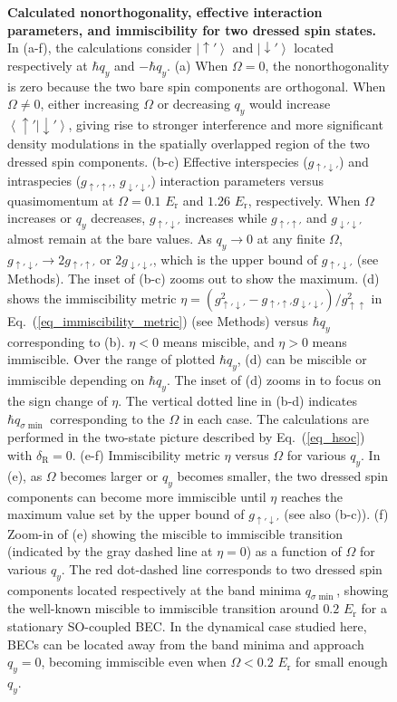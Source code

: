 \documentclass[showpacs,preprintnumbers,amsmath,amssymb, superscriptaddress, aps, reprint]{revtex4-1}
\def\E_r{E_{\text{r}}}
\def\deltaR{\delta_{\text{R}}}
\begin{document}
{{{\begin{figure}[ht]
\caption{\textbf{Calculated nonorthogonality, effective interaction parameters, and immiscibility for two dressed spin states.} In (a-f), the calculations consider $\left|\uparrow'\right\rangle$ and $\left|\downarrow'\right\rangle$ located respectively at $\hbar q_y$ and $-\hbar q_y$. (a) When $\Omega=0$, the nonorthogonality is zero because the two bare spin components are orthogonal. When $\Omega \neq 0$, either increasing $\Omega$ or decreasing $q_y$ would increase $\left\langle\uparrow'|\downarrow'\right\rangle$, giving rise to stronger interference and more significant density modulations in the spatially overlapped region of the two dressed spin components. (b-c) Effective interspecies ($g_{\uparrow'\downarrow'}$) and intraspecies ($g_{\uparrow'\uparrow'}$, $g_{\downarrow'\downarrow'}$) interaction parameters versus quasimomentum at $\Omega=0.1$ $\E_r$ and $1.26$ $\E_r$, respectively. When $\Omega$ increases or $q_y$ decreases, $g_{\uparrow'\downarrow'}$ increases while $g_{\uparrow'\uparrow'}$ and $g_{\downarrow'\downarrow'}$ almost remain at the bare values. As $q_y\rightarrow 0$ at any finite $\Omega$, $g_{\uparrow'\downarrow'}\rightarrow 2 g_{\uparrow'\uparrow'}$ or $2 g_{\downarrow'\downarrow'}$, which is the upper bound of $g_{\uparrow'\downarrow'}$ (see Methods). The inset of (b-c) zooms out to show the maximum. (d) shows the immiscibility metric $\eta=(g_{\uparrow'\downarrow'}^2-g_{\uparrow'\uparrow'}g_{\downarrow'\downarrow'})/g_{\uparrow\uparrow}^2$ in Eq.~(\ref{eq_immiscibility_metric}) (see Methods) versus $\hbar q_y$ corresponding to (b). $\eta<0$ means miscible, and $\eta>0$ means immiscible. Over the range of plotted $\hbar q_y$, (d) can be miscible or immiscible depending on $\hbar q_y$. The inset of (d) zooms in to focus on the sign change of $\eta$. The vertical dotted line in (b-d) indicates $\hbar q_{\sigma\min}$ corresponding to the $\Omega$ in each case. The calculations are performed in the two-state picture described by Eq.~(\ref{eq_hsoc}) with $\deltaR=0$. (e-f) Immiscibility metric $\eta$ versus $\Omega$ for various $q_y$. In (e), as $\Omega$ becomes larger or $q_y$ becomes smaller, the two dressed spin components can become more immiscible until $\eta$ reaches the maximum value set by the upper bound of $g_{\uparrow'\downarrow'}$ (see also (b-c)). (f) Zoom-in of (e) showing the miscible to immiscible transition (indicated by the gray dashed line at $\eta=0$) as a function of $\Omega$ for various $q_y$. The red dot-dashed line corresponds to two dressed spin components located respectively at the band minima $q_{\sigma \min}$, showing the well-known miscible to immiscible transition around $0.2$ $\E_r$ for a stationary SO-coupled BEC. In the dynamical case studied here, BECs can be located away from the band minima and approach $q_y=0$, becoming immiscible even when $\Omega<0.2$ $\E_r$ for small enough $q_y$.} 

\end{figure}}}}
\end{document}
